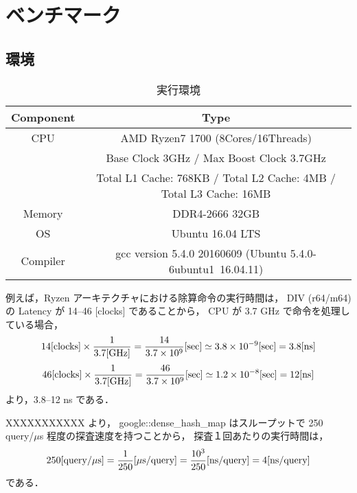 \chapter{ベンチマーク}
\label{chap_Results}

\section{環境}

\begin{table}[hbtp]
  \begin{center}
    \caption{実行環境}
    \begin{tabular}{cc} \hline
      Component & Type \rule[0pt]{0pt}{0pt} \\ \hline
      CPU & AMD Ryzen7 1700 (8Cores/16Threads) \rule[0pt]{0pt}{0pt} \\ 
      & Base Clock 3GHz / Max Boost Clock 3.7GHz \rule[0pt]{0pt}{0pt} \\
      & Total L1 Cache: 768KB / Total L2 Cache: 4MB / Total L3 Cache: 16MB \\
      Memory & DDR4-2666 32GB \rule[0pt]{0pt}{0pt} \\
      OS & Ubuntu 16.04 LTS \rule[0pt]{0pt}{0pt} \\
      Compiler & gcc version 5.4.0 20160609 (Ubuntu 5.4.0-6ubuntu1~16.04.11) \rule[0pt]{0pt}{0pt} \\ \hline
    \end{tabular}
  \end{center}
  \label{table_env}
\end{table}


例えば，Ryzen アーキテクチャにおける除算命令の実行時間は，
DIV (r64/m64) の Latency が 14--46 [clocks] であることから\cite{AgnerFog2018}，
CPU が 3.7 GHz で命令を処理している場合，
\begin{align*}
14 {\rm [clocks]} \times \frac{1}{3.7 {\rm [GHz]}}
= \frac{14}{3.7 \times 10^9} {\rm [sec]}
\simeq 3.8 \times 10^{-9} {\rm [sec]}
= 3.8 {\rm [ns]}
\end{align*}
\begin{align*}
46 {\rm [clocks]} \times \frac{1}{3.7 {\rm [GHz]}}
= \frac{46}{3.7 \times 10^9} {\rm [sec]}
\simeq 1.2 \times 10^{-8} {\rm [sec]}
= 12 {\rm [ns]}
\end{align*}
より，3.8--12 ns である．



XXXXXXXXXXX より，
google::dense\_hash\_map はスループットで 250 query/$\mu$s 程度の探査速度を持つことから，
探査１回あたりの実行時間は，
\begin{align*}
  250{\rm [query \slash \mu s]}
  = \frac{1}{250} {\rm [\mu s \slash query]}
  = \frac{10^3}{250} {\rm [ns \slash query]}
  = 4 {\rm [ns \slash query]}
\end{align*}
である．

